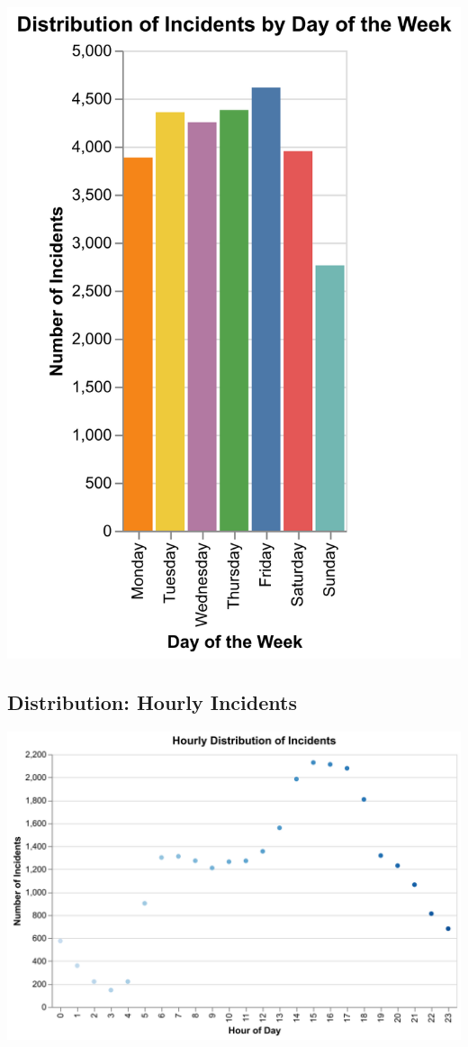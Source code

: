 \documentclass[
  letterpaper,
  DIV=11,
  numbers=noendperiod]{scrartcl}
\begin{document}
\begin{center}
\includegraphics{results/images/incidents_by_day.png}
\end{center}

\subsection{Distribution: Hourly
Incidents}\label{distribution-hourly-incidents}

\begin{center}
\includegraphics{results/images/incidents_by_hour.png}
\end{center}
\end{document}
